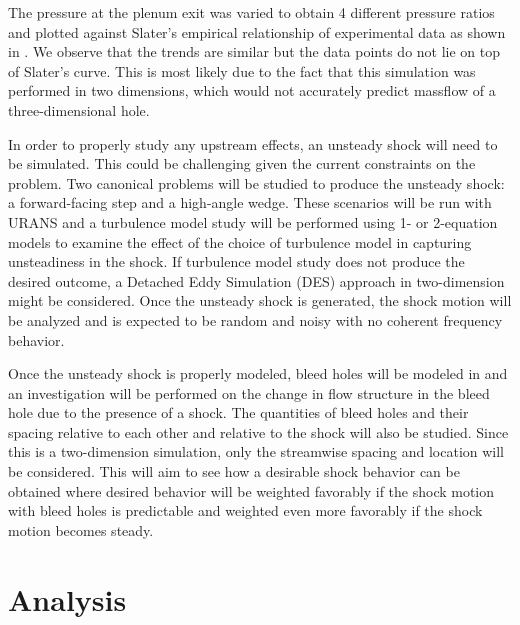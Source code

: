 
The pressure at the plenum exit was varied to obtain 4 different pressure ratios and plotted against Slater's empirical relationship of experimental data \cite{dumArticle} as shown in . We observe that the trends are similar but the data points do not lie on top of Slater's curve. This is most likely due to the fact that this simulation was performed in two dimensions, which would not accurately predict massflow of a three-dimensional hole.





In order to properly study any upstream effects, an unsteady shock will need to be simulated. This could be challenging given the current constraints on the problem. Two canonical problems will be studied to produce the unsteady shock: a forward-facing step and a high-angle wedge. These scenarios will be run with URANS and a turbulence model study will be performed using 1- or 2-equation models to examine the effect of the choice of turbulence model in capturing unsteadiness in the shock. If turbulence model study does not produce the desired outcome, a Detached Eddy Simulation (DES) approach in two-dimension might be considered. Once the unsteady shock is generated, the shock motion will be analyzed and is expected to be random and noisy with no coherent frequency behavior.

Once the unsteady shock is properly modeled, bleed holes will be modeled in and an investigation will be performed on the change in flow structure in the bleed hole due to the presence of a shock. The quantities of bleed holes and their spacing relative to each other and relative to the shock will also be studied. Since this is a two-dimension simulation, only the streamwise spacing and location will be considered. This will aim to see how a desirable shock behavior can be obtained where desired behavior will be weighted favorably if the shock motion with bleed holes is predictable and weighted even more favorably if the shock motion becomes steady.




\section{Analysis}
